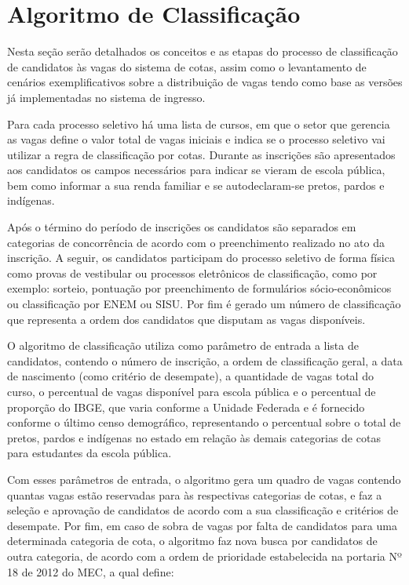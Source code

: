 \section{Algoritmo de Classificação}
\label{algoritimodeclassificacao}

Nesta seção serão detalhados os conceitos e as etapas do processo de classificação de candidatos às vagas do sistema de cotas, assim como o levantamento de cenários exemplificativos sobre a distribuição de vagas tendo como base as versões já implementadas no sistema de ingresso.

Para cada processo seletivo há uma lista de cursos, em que o setor que gerencia as vagas define o valor total de vagas iniciais e indica se o processo seletivo vai utilizar a regra de classificação por cotas. Durante as inscrições são apresentados aos candidatos os campos necessários para indicar se vieram de escola pública, bem como informar a sua renda familiar e se autodeclaram-se pretos, pardos e indígenas.

Após o término do período de inscrições os candidatos são separados em categorias de concorrência de acordo com o preenchimento realizado no ato da inscrição. A seguir, os candidatos participam do processo seletivo de forma física como provas de vestibular ou processos eletrônicos de classificação, como por exemplo: sorteio, pontuação por preenchimento de formulários sócio-econômicos ou classificação por \gls{ENEM} ou \gls{SISU}. Por fim é gerado um número de classificação que representa a ordem dos candidatos que disputam as vagas disponíveis.

O algoritmo de classificação utiliza como parâmetro de entrada a lista de candidatos, contendo o número de inscrição, a ordem de classificação geral, a data de nascimento (como critério de desempate), a quantidade de vagas total do curso, o percentual de vagas disponível para escola pública e o percentual de proporção do \gls{IBGE}, que varia conforme a Unidade Federada e é fornecido conforme o último censo demográfico, representando o percentual sobre o total de pretos, pardos e indígenas no estado em relação às demais categorias de cotas para estudantes da escola pública.

Com esses parâmetros de entrada, o algoritmo gera um quadro de vagas contendo quantas vagas estão reservadas para às respectivas categorias de cotas, e faz a seleção e aprovação de candidatos de acordo com a sua classificação e critérios de desempate. Por fim, em caso de sobra de vagas por falta de candidatos para uma determinada categoria de cota, o algoritmo faz nova busca por candidatos de outra categoria, de acordo com a ordem de prioridade estabelecida na portaria Nº 18 de 2012 do \gls{MEC}, a qual define:


